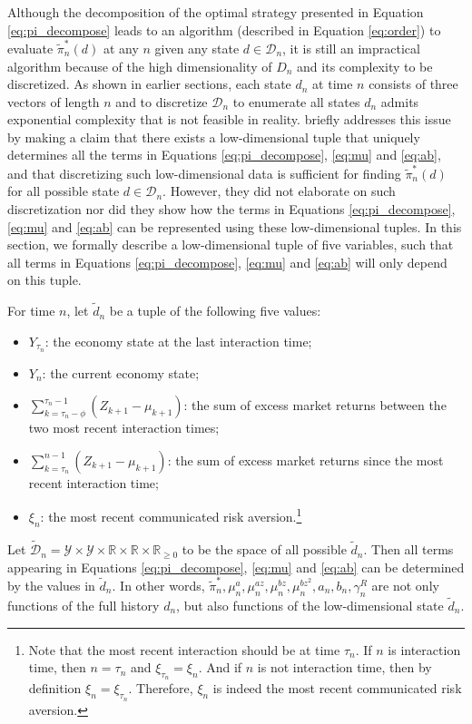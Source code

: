 Although the decomposition of the optimal strategy presented in Equation \eqref{eq:pi_decompose} leads to an algorithm (described in Equation \ref{eq:order}) to evaluate $\tilde\pi_n^*(d)$ at any $n$ given any state $d\in\mathcal D_n$, it is still an impractical algorithm because of the high dimensionality of $D_n$ and its complexity to be discretized. As shown in earlier sections, each state $d_n$ at time $n$ consists of three vectors of length $n$ and to discretize $\mathcal D_n$ to enumerate all states $d_n$ admits exponential complexity that is not feasible in reality.  briefly addresses this issue by making a claim that there exists a low-dimensional tuple that uniquely determines all the terms in Equations \eqref{eq:pi_decompose}, \eqref{eq:mu} and \eqref{eq:ab}, and that discretizing such low-dimensional data is sufficient for finding $\tilde\pi_n^*(d)$ for all possible state $d\in\mathcal{D}_n$. However, they did not elaborate on such discretization nor did they show how the terms in Equations \eqref{eq:pi_decompose}, \eqref{eq:mu} and \eqref{eq:ab} can be represented using these low-dimensional tuples. In this section, we formally describe a low-dimensional tuple of five variables, such that all terms in Equations \eqref{eq:pi_decompose}, \eqref{eq:mu} and \eqref{eq:ab} will only depend on this tuple.

\begin{theorem}\label{thm:disc}
    For time $n$, let $\tilde d_n$ be a tuple of the following five values:\begin{itemize}
        \item $Y_{\tau_n}$: the economy state at the last interaction time;
        \item $Y_n$: the current economy state;
        \item $\sum_{k=\tau_n-\phi}^{\tau_n-1}(Z_{k+1}-\mu_{k+1})$: the sum of excess market returns between the two most recent interaction times;
        \item $\sum_{k=\tau_n}^{n-1}(Z_{k+1}-\mu_{k+1})$: the sum of excess market returns since the most recent interaction time;
        \item $\xi_n$: the most recent communicated risk aversion.\footnote{Note that the most recent interaction should be at time $\tau_n$. If $n$ is interaction time, then $n=\tau_n$ and $\xi_{\tau_n}=\xi_n$. And if $n$ is not interaction time, then by definition $\xi_n=\xi_{\tau_n}$. Therefore, $\xi_n$ is indeed the most recent communicated risk aversion.}
    \end{itemize}
    Let $\tilde{\mathcal D}_n=\mathcal Y\times\mathcal Y\times\mathbb{R}\times\mathbb{R}\times\mathbb{R}_{\geq0}$ to be the space of all possible $\tilde d_n$. Then all terms appearing in Equations \eqref{eq:pi_decompose}, \eqref{eq:mu} and \eqref{eq:ab} can be determined by the values in $\tilde d_n$. In other words, $\tilde\pi_n^*,\mu_n^a,\mu_n^{az},\mu_n^{bz},\mu_n^{bz^2},a_n,b_n,\gamma_n^R$ are not only functions of the full history $d_n$, but also functions of the low-dimensional state $\tilde d_n$.
\end{theorem}

